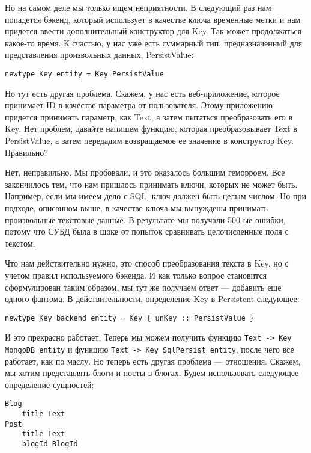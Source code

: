 Но на самом деле мы только ищем неприятности. В следующий раз нам попадется бэкенд, который использует в качестве ключа временные метки и нам придется ввести дополнительный конструктор для Key. Так может продолжаться какое-то время. К счастью, у нас уже есть суммарный тип, предназначенный для представления произвольных данных, PersistValue:

\begin{lstlisting}
newtype Key entity = Key PersistValue
\end{lstlisting}

Но тут есть другая проблема. Скажем, у нас есть веб-приложение, которое принимает ID в качестве параметра от пользователя. Этому приложению придется принимать параметр, как Text, а затем пытаться преобразовать его в Key. Нет проблем, давайте напишем функцию, которая преобразовывает Text в PersistValue, а затем передадим возвращаемое ее значение в конструктор Key. Правильно?

Нет, неправильно. Мы пробовали, и это оказалось большим геморроем. Все закончилось тем, что нам пришлось принимать ключи, которых не может быть. Например, если мы имеем дело с SQL, ключ должен быть целым числом. Но при подходе, описанном выше, в качестве ключа мы вынуждены принимать произвольные текстовые данные. В результате мы получали 500-ые ошибки, потому что СУБД была в шоке от попыток сравнивать целочисленные поля с текстом.

Что нам действительно нужно, это способ преобразования текста в Key, но с учетом правил используемого бэкенда. И как только вопрос становится сформулирован таким образом, мы тут же получаем ответ --- добавить еще одного фантома. В действительности, определение Key в Persistent следующее:

\begin{lstlisting}
newtype Key backend entity = Key { unKey :: PersistValue }
\end{lstlisting}

И это прекрасно работает. Теперь мы можем получить функцию \lstinline'Text -> Key MongoDB entity' и функцию \lstinline'Text -> Key SqlPersist entity', после чего все работает, как по маслу. Но теперь есть другая проблема --- отношения. Скажем, мы хотим представлять блоги и посты в блогах. Будем использовать следующее определение сущностей:

\begin{lstlisting}
Blog
    title Text
Post
    title Text
    blogId BlogId
\end{lstlisting}

